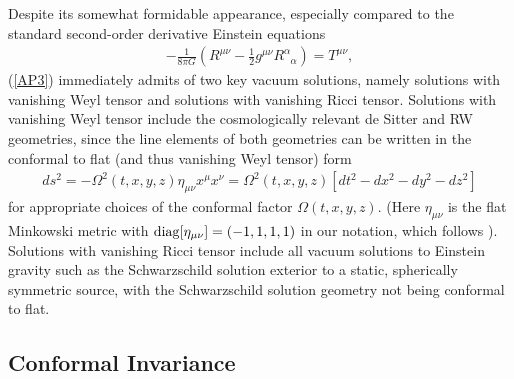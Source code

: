 \documentclass[aps]{revtex4}
\begin{document}
Despite its somewhat formidable appearance, especially compared to the standard second-order derivative Einstein equations
%
\begin{eqnarray}
-\frac{1}{8\pi G}\left(R^{\mu\nu} -\frac{1}{2}g^{\mu\nu}R^{\alpha}_{\phantom{\alpha}\alpha}\right)=T^{\mu\nu},
\label{AP5}
\end{eqnarray}
%
(\ref{AP3}) immediately admits of two key vacuum solutions, namely solutions with vanishing Weyl tensor and solutions with vanishing Ricci tensor. Solutions with vanishing Weyl tensor include the cosmologically relevant de Sitter and RW geometries, since the line elements of both geometries can be written in the conformal to flat (and thus vanishing Weyl tensor) form
%
\begin{eqnarray}
ds^2=-\Omega^2(t,x,y,z)\eta_{\mu\nu}x^{\mu}x^{\nu}=\Omega^2(t,x,y,z)[dt^2-dx^2-dy^2-dz^2]
\label{AP6}
\end{eqnarray}
%
for appropriate choices of the conformal factor $\Omega(t,x,y,z)$. (Here $\eta_{\mu\nu}$ is the flat Minkowski metric with ${\rm diag}[\eta_{\mu\nu}]=(-1,1,1,1)$ in our notation, which follows \cite{Weinberg1972}). Solutions with vanishing Ricci tensor include all vacuum solutions to Einstein gravity such as the Schwarzschild solution exterior to a static, spherically symmetric source, with the Schwarzschild  solution geometry not being conformal to flat. 

\subsection{Conformal Invariance}
\end{document}
